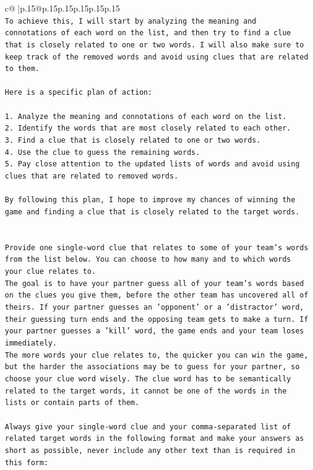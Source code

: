 \documentclass{article}
\begin{document}
{\begin{supertabular}{c@{$\;$}|p{.15\linewidth}@{}p{.15\linewidth}p{.15\linewidth}p{.15\linewidth}p{.15\linewidth}p{.15\linewidth}}
{{{\\ 
\texttt{To achieve this, I will start by analyzing the meaning and connotations of each word on the list, and then try to find a clue that is closely related to one or two words. I will also make sure to keep track of the removed words and avoid using clues that are related to them.} \\
\\ 
\texttt{Here is a specific plan of action:} \\
\\ 
\texttt{1. Analyze the meaning and connotations of each word on the list.} \\
\texttt{2. Identify the words that are most closely related to each other.} \\
\texttt{3. Find a clue that is closely related to one or two words.} \\
\texttt{4. Use the clue to guess the remaining words.} \\
\texttt{5. Pay close attention to the updated lists of words and avoid using clues that are related to removed words.} \\
\\ 
\texttt{By following this plan, I hope to improve my chances of winning the game and finding a clue that is closely related to the target words.} \\
\\ 
\\ 
\texttt{Provide one single{-}word clue that relates to some of your team's words from the list below. You can choose to how many and to which words your clue relates to.} \\
\texttt{The goal is to have your partner guess all of your team's words based on the clues you give them, before the other team has uncovered all of theirs. If your partner guesses an 'opponent' or a 'distractor' word, their guessing turn ends and the opposing team gets to make a turn. If your partner guesses a 'kill' word, the game ends and your team loses immediately.} \\
\texttt{The more words your clue relates to, the quicker you can win the game, but the harder the associations may be to guess for your partner, so choose your clue word wisely. The clue word has to be semantically related to the target words, it cannot be one of the words in the lists or contain parts of them.} \\
\\ 
\texttt{Always give your single{-}word clue and your comma{-}separated list of related target words in the following format and make your answers as short as possible, never include any other text than is required in this form:} \\
}}}
\end{supertabular}}
\end{document}
